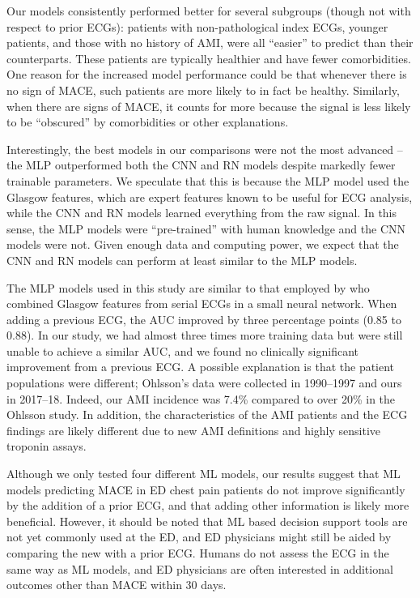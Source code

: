 \documentclass[preprint]{elsarticle}
\begin{document}
Our models consistently performed better for several subgroups (though not with respect to prior ECGs): patients with non-pathological index ECGs, younger patients, and those with no history of AMI, were all ``easier'' to predict than their counterparts. These patients are typically healthier and have fewer comorbidities. One reason for the increased model performance could be that whenever there is no sign of MACE, such patients are more likely to in fact be healthy. Similarly, when there are signs of MACE, it counts for more because the signal is less likely to be ``obscured'' by comorbidities or other explanations.

Interestingly, the best models in our comparisons were not the most advanced – the MLP outperformed both the CNN and RN models despite markedly fewer trainable parameters. We speculate that this is because the MLP model used the Glasgow features, which are expert features known to be useful for ECG analysis, while the CNN and RN models learned everything from the raw signal. In this sense, the MLP models were ``pre-trained'' with human knowledge and the CNN models were not. Given enough data and computing power, we expect that the CNN and RN models can perform at least similar to the MLP models.

The MLP models used in this study are similar to that employed by \citet{ohlsson2001} who combined Glasgow features from serial ECGs in a small neural network. When adding a previous ECG, the AUC improved by three percentage points (0.85 to 0.88). In our study, we had almost three times more training data but were still unable to achieve a similar AUC, and we found no clinically significant improvement from a previous ECG. A possible explanation is that the patient populations were different; Ohlsson's data were collected in 1990--1997 and ours in 2017--18. Indeed, our AMI incidence was 7.4\% compared to over 20\% in the Ohlsson study. In addition, the characteristics of the AMI patients and the ECG findings are likely different due to new AMI definitions and highly sensitive troponin assays. 

Although we only tested four different ML models, our results suggest that ML models predicting MACE in ED chest pain patients do not improve significantly by the addition of a prior ECG, and that adding other information is likely more beneficial. However, it should be noted that ML based decision support tools are not yet commonly used at the ED, and ED physicians might still be aided by comparing the new with a prior ECG. Humans do not assess the ECG in the same way as ML models, and ED physicians are often interested in additional outcomes other than MACE within 30 days. 
\end{document}
